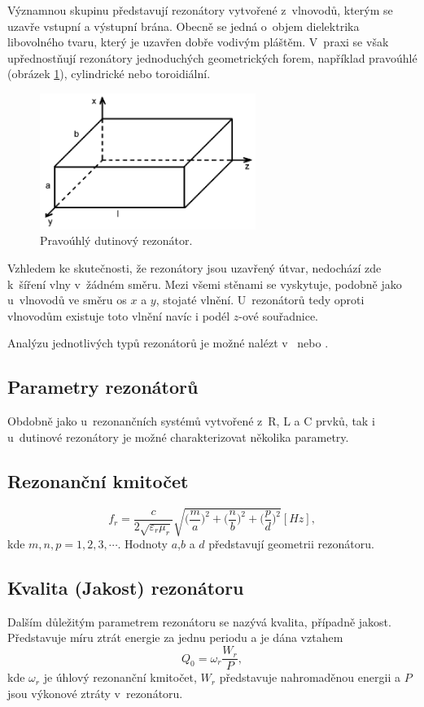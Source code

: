 Významnou skupinu představují rezonátory vytvořené z~vlnovodů, kterým se uzavře vstupní a výstupní brána. Obecně se jedná o~objem dielektrika libovolného tvaru, který je uzavřen dobře vodivým pláštěm. V~praxi se však upřednostňují rezonátory jednoduchých geometrických forem, například pravoúhlé (obrázek \ref{obr:evlny_rezonator}), cylindrické nebo toroidiální. 
\begin{figure}[!h]
	\centering
	\includegraphics[width=7cm]{evlny_rezonator.png}
	\caption{Pravoúhlý dutinový rezonátor. \cite{tripak}}
	\label{obr:evlny_rezonator}
\end{figure}

Vzhledem ke skutečnosti, že rezonátory jsou uzavřený útvar, nedochází zde k~šíření vlny v~žádném směru. Mezi všemi stěnami se vyskytuje, podobně jako u~vlnovodů ve směru os $x$ a $y$, stojaté vlnění. U~rezonátorů tedy oproti vlnovodům existuje toto vlnění navíc i podél $z$-ové souřadnice. 

Analýzu jednotlivých typů rezonátorů je možné nalézt v~\cite{emp} nebo \cite{tripak}.

\subsection{Parametry rezonátorů}
Obdobně jako u~rezonančních systémů vytvořené z~R, L a C prvků, tak i u~dutinové rezonátory je možné charakterizovat několika parametry.
\subsection*{Rezonanční kmitočet}
\begin{displaymath}
	f_r = \frac{c}{2\sqrt{\varepsilon_r \mu_r}}\sqrt{\bigg(\frac{m}{a}\bigg)^{2} + \bigg(\frac{n}{b}\bigg)^{2} + \bigg(\frac{p}{d}\bigg)^{2}}\unit{[Hz]},
\end{displaymath}
kde $m, n, p = 1, 2, 3,\cdots$. Hodnoty $a$,$b$ a $d$ představují geometrii rezonátoru.
\subsection*{Kvalita (Jakost) rezonátoru}
Dalším důležitým parametrem rezonátoru se nazývá kvalita, případně jakost. Představuje míru ztrát energie za jednu periodu a je dána vztahem
\begin{displaymath}
	Q_0 = \omega_r \frac{W_{r}}{P},
\end{displaymath}
kde $\omega_r$ je úhlový rezonanční kmitočet, $W_r$ představuje nahromaděnou  energii a $P$ jsou výkonové ztráty v~rezonátoru.
\newpage